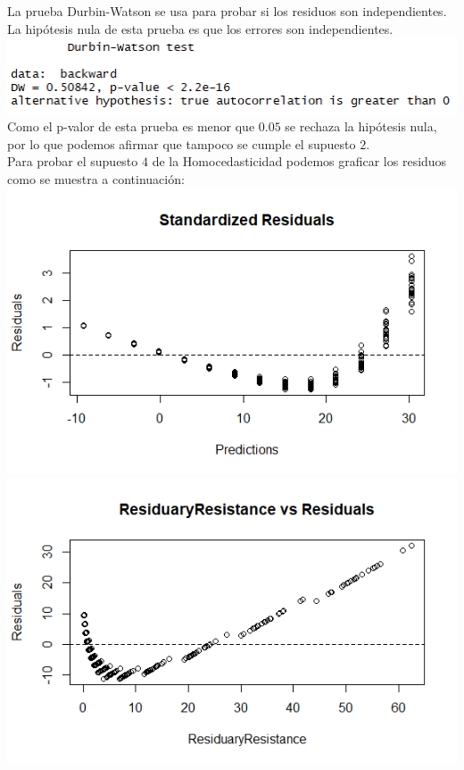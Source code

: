 \documentclass[twoside]{article}
\begin{document}
\begin{multicols}{2}
La prueba Durbin-Watson se usa para probar si los residuos son independientes. La hip\'otesis nula de esta prueba es que los errores son independientes.\\

\includegraphics[scale=0.5]{images/pic_08.png} \\

Como el p-valor de esta prueba es menor que $0.05$ se rechaza la hip\'otesis nula, por lo que podemos afirmar que tampoco se cumple el supuesto $2$.\\

Para probar el supuesto $4$ de la Homocedasticidad podemos graficar los residuos como se muestra a continuaci\'on:\\

\includegraphics[scale = 0.4]{images/pic_09.png} \\
\includegraphics[scale=0.4]{images/pic_10.png} \\


\end{multicols}
\end{document}
